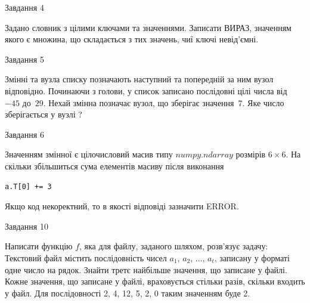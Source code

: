 \documentclass[12pt, ukrainian]{article}
\begin{document}
{\begin{minipage}[t]{8.0cm}
\end{minipage}


               
{\begin{center}Завдання {4}\end{center}}
\vspace{-4mm}
Задано словник  з цілими ключами та значеннями. Записати ВИРАЗ, значенням якого є множина, що складається  з тих значень, чиї ключі невід'єм\-ні.\par

\vspace{10mm}
               
{\begin{center}Завдання {5}\end{center}}
\vspace{-4mm}
Змінні  та  вузла списку позначають наступний та попередній за ним вузол відповідно. Починаючи з голови, у список записано послідовні цілі числа від~$-45$ до~$29$. Нехай змінна  позначає вузол, що зберігає значення~$7$.
Яке число зберігається у вузлі  ?\par

               
{\begin{center}Завдання {6}\end{center}}
\vspace{-4mm}
Значенням змінної  є цілочисловий масив типу $numpy.ndarray$ розмірів $6{\times}6$. На скільки збільшиться сума елементів масиву  після виконання
\begin{verbatim}
a.T[0] += 3
\end{verbatim}


Якщо код некоректний, то в якості відповіді зазначити ERROR.\par

               
{\begin{center}Завдання {10}\end{center}}
\vspace{-4mm}

Написати функцію $f$, яка для файлу, заданого шляхом, розв’язує задачу:\\ Текстовий файл містить послідовність чисел $a_1$, $a_2$, $\ldots$, $a_t$, записану у форматі одне число на рядок. Знайти третє найбільше значення, що записане у файлі. Кожне значення, що записане у файлі, враховується стільки разів, скільки входить у файл. Для послідовності 2, 4, 12, 5, 2, 0 таким значенням буде 2.

}
\end{document}
